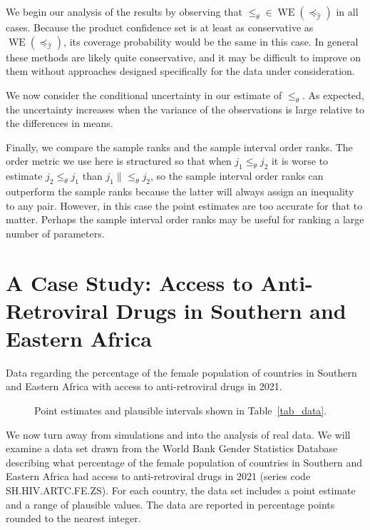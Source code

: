 \documentclass[12pt]{article}
\newcommand{\incomp}[1][]{\|_{#1}}
\newcommand{\iord}{{\preceq_{\hat{\mathcal{I}}}}}
\newcommand{\pord}{{\leqslant_{\theta}}}
\newcommand{\WE}[1]{\operatorname{WE}(#1)}
\numberwithin{theorem}{section}
\begin{document}
We begin our analysis of the results by observing that $\pord \in \WE{\iord}$ in all cases.  Because the product confidence set is at least as conservative as $\WE{\iord}$, its coverage probability would be the same in this case.  In general these methods are likely quite conservative, and it may be difficult to improve on them without approaches designed specifically for the data under consideration.

We now consider the conditional uncertainty in our estimate of $\pord$.  As expected, the uncertainty increases when the variance of the observations is large relative to the differences in means.

Finally, we compare the sample ranks and the sample interval order ranks.  The order metric we use here is structured so that when $j_1 \pord j_2$ it is worse to estimate $j_2 \pord j_1$ than $j_1 \incomp{\pord} j_2$, so the sample interval order ranks can outperform the sample ranks because the latter will always assign an inequality to any pair.  However, in this case the point estimates are too accurate for that to matter.  Perhaps the sample interval order ranks may be useful for ranking a large number of parameters.

\section{A Case Study: Access to Anti-Retroviral Drugs in Southern and Eastern Africa}
\label{sec_data}

\begin{table}[p]
\centering

\caption{Data regarding the percentage of the female population of countries in Southern and Eastern Africa with access to anti-retroviral drugs in 2021.}
\label{tab_data}
\end{table}

\begin{figure}[p]
\centering

\caption{Point estimates and plausible intervals shown in Table~\ref{tab_data}.}
\label{fig_data}
\end{figure}

We now turn away from simulations and into the analysis of real data.  We will examine a data set drawn from the World Bank Gender Statistics Database~\citep{worldBankData} describing what percentage of the female population of countries in Southern and Eastern Africa had access to anti-retroviral drugs in 2021 (series code SH.HIV.ARTC.FE.ZS).  For each country, the data set includes a point estimate and a range of plausible values.  The data are reported in percentage points rounded to the nearest integer.
\end{document}
